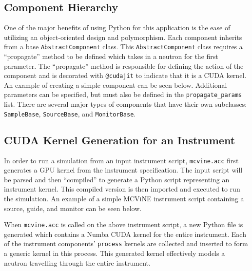 \subsection{Component Hierarchy}

One of the major benefits of using Python for this application is the ease of utilizing an object-oriented design and polymorphism.
Each component inherits from a base \texttt{AbstractComponent} class. This \texttt{AbstractComponent} class requires a ``propagate'' method to be defined which takes in a neutron for the first parameter. The ``propagate'' method is responsible for defining the action of the component and is decorated with \texttt{@cudajit} to indicate that it is a CUDA kernel. An example of creating a simple component can be seen below. Additional parameters can be specified, but must also be defined in the \texttt{propagate\_params} list.
There are several major types of components that have their own subclasses: \texttt{SampleBase}, \texttt{SourceBase}, and \texttt{MonitorBase}.

\vspace{1mm}


\subsection{CUDA Kernel Generation for an Instrument}

In order to run a simulation from an input instrument script, \texttt{mcvine.acc} first generates a GPU kernel from the instrument specification. The input script will be parsed and then ``compiled'' to generate a Python script representing an instrument kernel. This compiled version is then imported and executed to run the simulation. An example of a simple MCViNE instrument script containing a source, guide, and monitor can be seen below.

\vspace{1mm}

\vspace{1mm}

When \texttt{mcvine.acc} is called on the above instrument script, a new Python file is generated which contains a Numba CUDA kernel for the entire instrument. Each of the instrument components' \texttt{process} kernels are collected and inserted to form a generic kernel in this process. This generated kernel effectively models a neutron travelling through the entire instrument.

